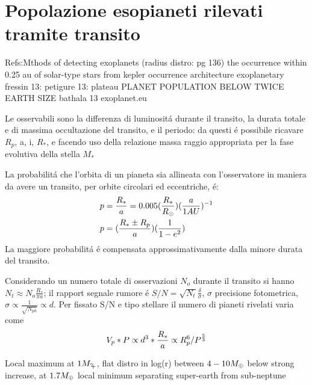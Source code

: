 \clearpage

\section{Popolazione esopianeti rilevati tramite transito}

\begin{workout}
Refs:Mthods of detecting exoplanets (radius distro: pg 136)
the occurrence within 0.25 au of solar-type stars from kepler
occurrence architecture exoplanetary
fressin 13: 
petigure 13: plateau PLANET POPULATION BELOW TWICE EARTH SIZE
bathala 13
exoplanet.eu
\end{workout}

Le osservabili sono la differenza di luminosit\'a durante il transito, la durata totale e di massima occultazione del transito, e il periodo: da questi \'e possibile ricavare $R_p$, a, i, $R_*$, e facendo uso della relazione massa raggio appropriata per la fase evolutiva della stella $M_*$

La probabilit\'a che l'orbita di un pianeta sia allineata con l'osservatore in maniera da avere un transito, per orbite circolari ed eccentriche, \'e:
\begin{align*}
&p=\frac{R_*}{a}=0.005(\frac{R_*}{R_{\odot}{}})(\frac{a}{1AU})^{-1}\\
&p=(\frac{R_*\pm R_p}{a})(\frac{1}{1-e^2})
\end{align*}
La maggiore probabilit\'a \'e compensata approssimativamente dalla minore durata del transito.

\begin{workout}
Considerando un numero totale di osservazioni $N_o$ durante il transito si hanno $N_t\approx N_o\frac{R_*}{\pi a}$; il rapport segnale rumore \'e $S/N=\sqrt{N_t}\frac{\delta}{\sigma}$, $\sigma$ precisione fotometrica, $\sigma\propto\frac{1}{\sqrt{N_{ph}}}\propto d$. Per fissato S/N e tipo stellare il numero di pianeti rivelati varia come
\begin{equation}
V_p*P\propto d^3*\frac{R_*}{a}\propto R_p^6/P^{\frac{5}{3}}
\end{equation}
\end{workout}

\begin{workout}
Local maximum at $1\mjupiter{}$, flat distro in log(r) between $4-10M_{\oplus}{}$ below strong increase, at $1.7M_{\oplus}{}$ local minimum separating super-earth from sub-neptune
\end{workout}

